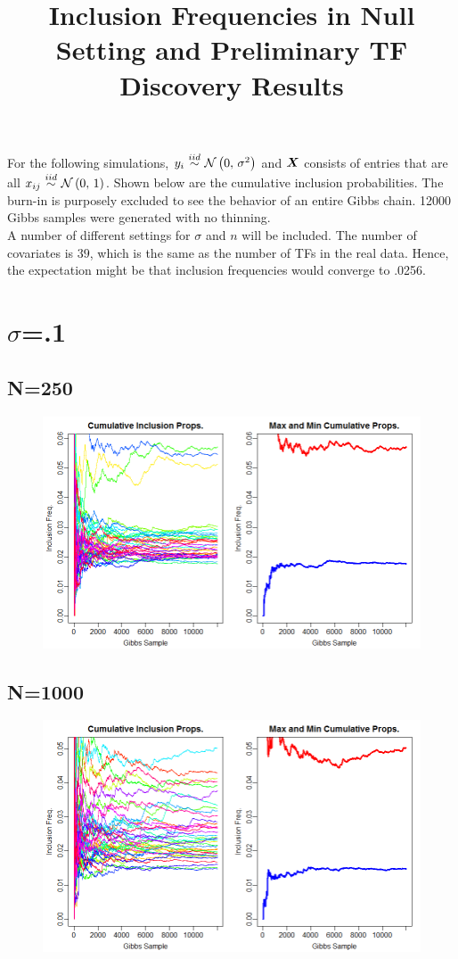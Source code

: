 \documentclass[12pt]{article}
\title{Inclusion Frequencies in Null Setting and Preliminary TF Discovery Results}
\begin{document}
\maketitle
For the following simulations, $y_{i}\iid\normnot{0}{\sigma^2}$ and $\boldsymbol{X}$ consists of entries that are all $x_{ij}\iid\normnot{0}{1}$. Shown below are the cumulative inclusion probabilities. The burn-in is purposely excluded to see the behavior of an entire Gibbs chain. 12000 Gibbs samples were generated with no thinning. \\

A number of different settings for $\sigma$ and $n$ will be included. The number of covariates is $39$, which is the same as the number of TFs in the real data. Hence, the expectation might be that inclusion frequencies would converge to .0256. 
\newpage
\section{$\sigma$=.1}
\subsection*{N=250}
\begin{figure}[H]
\centerline{\includegraphics[scale=.52]{sqpt1_n250}}
\end{figure}

\subsection*{N=1000}
\begin{figure}[H]
\centerline{\includegraphics[scale=.52]{sqpt1_n1000}}
\end{figure}
\end{document}
